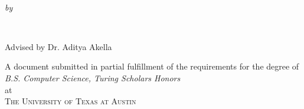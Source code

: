 \begin{titlepage}
  \vspace*{5cm}
  \makeatletter
  \begin{center}
    \begin{Huge}
      \@title
    \end{Huge}\\
    \begin{Large}
      \@subtitle
    \end{Large}
    \emph{by}\\
    \begin{Large}
        \@author\\
    \end{Large}
    \begin{Large}
        \vspace{5mm}
        Advised by Dr. Aditya Akella
    \end{Large}
    \vfill
    A document submitted in partial fulfillment
    of the requirements for the degree of\\
    \emph{B.S. Computer Science, Turing Scholars Honors}\\
    at\\
    \textsc{The University of Texas at Austin}
  \end{center}
  \makeatother
\end{titlepage}

